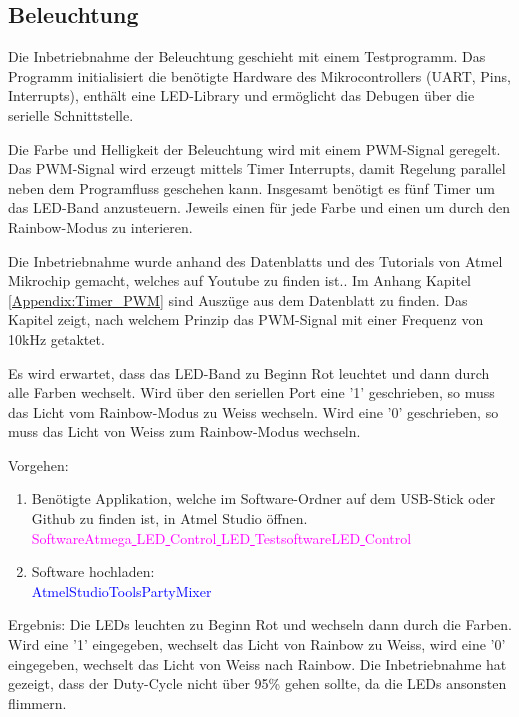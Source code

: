 \subsection{Beleuchtung}
\label{subsec:Inbetriebnahme_Beleuchtung}

Die Inbetriebnahme der Beleuchtung geschieht mit einem Testprogramm. Das Programm initialisiert die benötigte Hardware des Mikrocontrollers (UART, Pins, Interrupts), enthält eine LED-Library und ermöglicht das Debugen über die serielle Schnittstelle.

Die Farbe und Helligkeit der Beleuchtung wird mit einem PWM-Signal geregelt. Das PWM-Signal wird erzeugt mittels Timer Interrupts, damit Regelung parallel neben dem Programfluss geschehen kann. Insgesamt benötigt es fünf Timer um das LED-Band anzusteuern. Jeweils einen für jede Farbe und einen um durch den Rainbow-Modus zu interieren.

Die Inbetriebnahme wurde anhand des Datenblatts und des Tutorials von Atmel Mikrochip gemacht, welches auf Youtube zu finden ist.\cite{mikrochip_makes_getting_2015}\cite{mikrochip_makes_getting_2015-1}\cite{mikrochip_makes_getting_2015-2}. Im Anhang Kapitel \ref{Appendix:Timer_PWM} sind Auszüge aus dem Datenblatt zu finden. Das Kapitel zeigt, nach welchem Prinzip das PWM-Signal mit einer Frequenz von 10kHz getaktet.

Es wird erwartet, dass das LED-Band zu Beginn Rot leuchtet und dann durch alle Farben wechselt. Wird über den seriellen Port eine '1' geschrieben, so muss das Licht vom Rainbow-Modus zu Weiss wechseln. Wird eine '0' geschrieben, so muss das Licht von Weiss zum Rainbow-Modus wechseln.

Vorgehen:

\begin{enumerate}
\item Benötigte Applikation, welche im Software-Ordner auf dem USB-Stick oder Github \cite{aebi_projekt-6softwareatmega_2020} zu finden ist, in Atmel Studio öffnen.\\
\textcolor{magenta}{Software\textrightarrow Atmega\underline{ }LED\underline{ }Control\underline{ }LED\underline{ }Testsoftware\textrightarrow LED\underline{ }Control}\\

\item Software hochladen:\\
\textcolor{blue}{AtmelStudio\textrightarrow Tools\textrightarrow PartyMixer}\\

\end{enumerate}

Ergebnis: Die LEDs leuchten zu Beginn Rot und wechseln dann durch die Farben. Wird eine '1' eingegeben, wechselt das Licht von Rainbow zu Weiss, wird eine '0' eingegeben, wechselt das Licht von Weiss nach Rainbow.
Die Inbetriebnahme hat gezeigt, dass der Duty-Cycle nicht über 95\% gehen sollte, da die LEDs ansonsten flimmern.